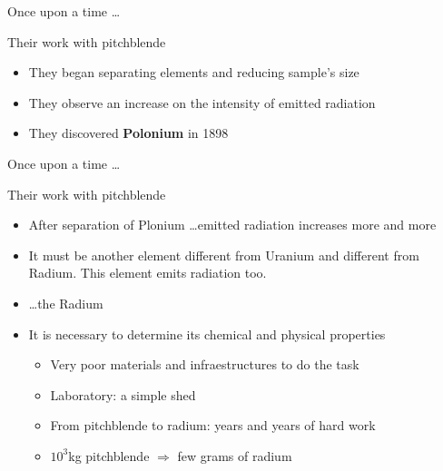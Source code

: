 \begin{frame}{Once upon a time \ldots}

\begin{exampleblock}{Their work with pitchblende}

\begin{itemize}

\item They began separating elements and reducing sample's size
\item They observe an increase on the intensity of emitted radiation
\item They discovered \textbf{Polonium} in 1898

\end{itemize}

\end{exampleblock}

\end{frame}

\begin{frame}{Once upon a time \ldots}

\begin{exampleblock}{Their work with pitchblende}

\begin{itemize}

\item After separation of Plonium \ldots emitted radiation increases more and more
\item It must be another element different from Uranium and different from Radium. This element emits radiation too.
\pause \item \ldots the Radium 
\item It is necessary to determine its chemical and physical properties

\pause \begin{itemize}
\item Very poor materials and infraestructures to do the task
\item Laboratory: a simple shed
\item From pitchblende to radium: years and years of hard work
\pause \item $10^3$kg pitchblende $\Longrightarrow$ few grams of radium
\end{itemize}

\end{itemize}

\end{exampleblock}

\end{frame}

